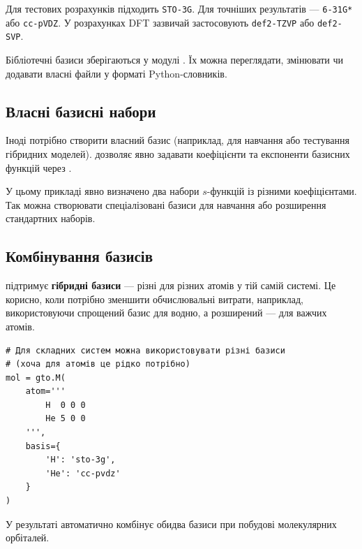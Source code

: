 Для тестових розрахунків підходить \texttt{STO-3G}.
Для точніших результатів --- \texttt{6-31G*} або \texttt{cc-pVDZ}.
У розрахунках DFT зазвичай застосовують \texttt{def2-TZVP} або \texttt{def2-SVP}.

\begin{commentbox}[Порада]
	Бібліотечні базиси \PySCF{} зберігаються у модулі \href{https://pyscf.org/pyscf_api_docs/pyscf.gto.basis}{}.
	Їх можна переглядати, змінювати чи додавати власні файли у форматі Python-словників.
\end{commentbox}

\subsection{Власні базисні набори}

Іноді потрібно створити власний базис (наприклад, для навчання або тестування гібридних моделей).
\PySCF{} дозволяє явно задавати коефіцієнти та експоненти базисних функцій через .


У цьому прикладі явно визначено два набори $s$-функцій із різними коефіцієнтами.
Так можна створювати спеціалізовані базиси для навчання або розширення стандартних наборів.

\subsection{Комбінування базисів}

\PySCF{} підтримує \textbf{гібридні базиси} --- різні для різних атомів у тій самій системі.
Це корисно, коли потрібно зменшити обчислювальні витрати, наприклад,
використовуючи спрощений базис для водню, а розширений --- для важчих атомів.

\begin{verbatim}
# Для складних систем можна використовувати різні базиси
# (хоча для атомів це рідко потрібно)
mol = gto.M(
    atom='''
        H  0 0 0
        He 5 0 0
    ''',
    basis={
        'H': 'sto-3g',
        'He': 'cc-pvdz'
    }
)
\end{verbatim}

У результаті \PySCF{} автоматично комбінує обидва базиси при побудові молекулярних орбіталей.


